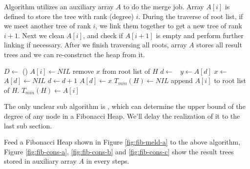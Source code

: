 \documentclass{article}
\begin{document}
Algorithm  utilizes an auxiliary array $A$ to do the 
merge job. Array $A[i]$ is defined to store the tree with rank (degree) $i$.
During the traverse of root list, if we meet another tree of rank $i$, we 
link them together to get a new tree of rank $i+1$. Next we clean $A[i]$, 
and check if $A[i+1]$ is empty and perform further linking if necessary.
After we finish traversing all roots, array $A$ stores all result trees
and we can re-construct the heap from it.

\begin{algorithmic}[1]
  \State $D \gets $ ()
    \State $A[i] \gets NIL$
  \EndFor
    \State remove $x$ from root list of $H$
    \State $d \gets $ 
    \
      \State $y \gets A[d]$
      \State $x \gets $ 
      \State $A[d] \gets NIL$
      \State $d \gets d + 1$
    \EndWhile
    \State $A[d] \gets x$
  \EndFor
  \State $T_{min}(H) \gets NIL$ 
  \For{$i \gets 0$ to $D$}
      \State append $A[i]$ to root list of $H$.
        \State $T_{min}(H) \gets A[i]$
      \EndIf
    \EndIf
  \EndFor
\EndFunction
\end{algorithmic}

The only unclear sub algorithm is , which can determine
the upper bound of the degree of any node in a Fibonacci Heap. We'll delay 
the realization of it to the last sub section.

Feed a Fibonacci Heap shown in Figure \ref{fig:fib-meld-a} to the above algorithm,
Figure \ref{fig:fib-cons-a}, \ref{fig:fib-cons-b} and \ref{fig:fib-cons-c}
show the result trees stored in auxiliary array $A$ in every steps.

\end{document}

